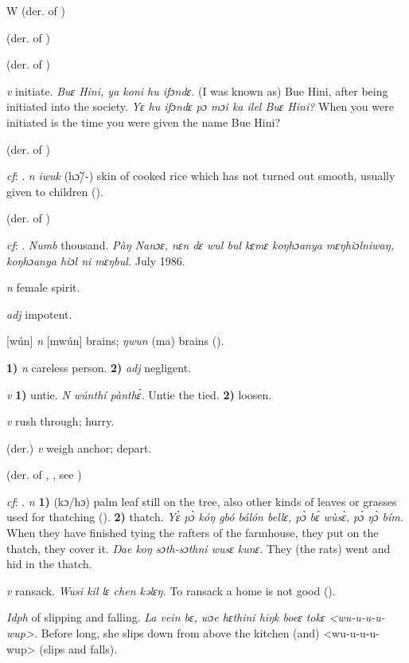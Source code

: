 \begin{letter}{W}
 (der. of ) 

 (der. of ) 

 (der. of ) 

 \textit{v} initiate. \textit{Buɛ Hini, ya koni hu ifɔndɛ.} (I was known as) Bue Hini, after being initiated into the society. \textit{Yɛ hu ifɔndɛ pɔ mɔi ka ilel Buɛ Hini?} When you were initiated is the time you were given the name Bue Hini?

 (der. of ) 

 \textit{cf}: . \textit{n} \textit{iwuk} (hɔ̃/-) skin of cooked rice which has not turned out smooth, usually given to children (\citealt{Pichl1967}). 

 (der. of ) 

 \textit{cf}: . \textit{Numb} thousand. \textit{Pàŋ Nanɔɛ, nɛn dɛ wul bul kɛmɛ koŋhɔanya mɛŋhiɔlniwaŋ, koŋhɔanya hiɔl ni mɛŋbul.} July 1986.

 \textit{n} female spirit.

 \textit{adj} impotent.

 [wún] \textit{n} [mwún] brains; \textit{ŋwun} (ma) brains (\citealt{Pichl1967}). 

 \textbf{1)} \textit{n} careless person. \textbf{2)} \textit{adj} negligent.

 \textit{v} \textbf{1)} untie. \textit{N wúnthí pànthɛ́.} Untie the tied. \textbf{2)} loosen.

 \textit{v} rush through; hurry.

 (der.) \textit{v} weigh anchor; depart.

 (der. of , , see ) 

 \textit{cf}: . \textit{n} \textbf{1)} (kɔ/hɔ) palm leaf still on the tree, also other kinds of leaves or grasses used for thatching (\citealt{Pichl1967}). \textbf{2)} thatch. \textit{Yɛ̀ pɔ̀ kóŋ gbó bálón bellɛ, pɔ̀ bɛ́ wùsɛ̀, pɔ̀ ŋɔ̀ bím.} When they have finished tying the rafters of the farmhouse, they put on the thatch, they cover it. \textit{Ŋae koŋ sɔth-sɔthni wusɛ kunɛ.} They (the rats) went and hid in the thatch.

 \textit{v} ransack. \textit{Wusi kil lɛ chen kəlɛŋ.} To ransack a home is not good (\citealt{Pichl1967}).

 \textit{Idph} of slipping and falling. \textit{La vein bɛ, wɔe hɛthini hiŋk boeɛ tokɛ <wu-u-u-u-wup>.} Before long, she slips down from above the kitchen (and) <wu-u-u-u-wup> (slips and falls).

\end{letter}
